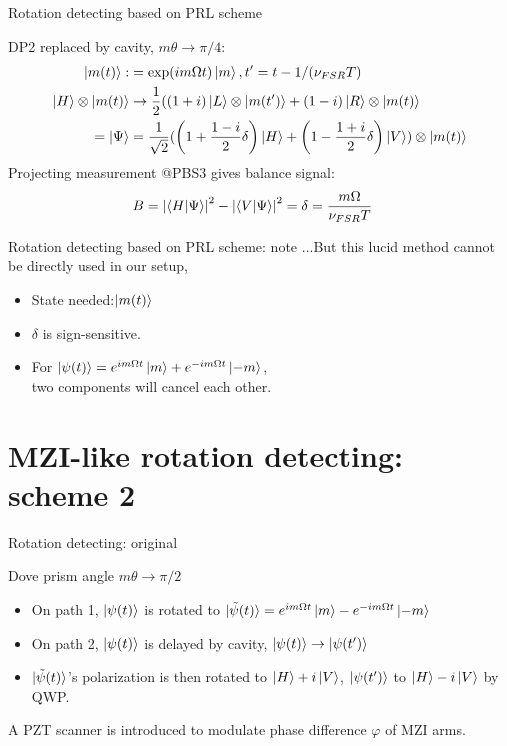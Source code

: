 \documentclass[amssymb, amsmath]{beamer}
\begin{document}
\begin{frame}{Rotation detecting based on PRL scheme}

DP2 replaced by cavity, $m\theta\to\pi/4$:
\begin{align}
    \ket{m(t)} :&= \exp(i m\Omega t)\ket{m}, t^\prime = t-1/(\nu_{FSR}T) \\ 
    \ket{H}\otimes\ket{m(t)} &\to \frac{1}{2}((1+i)\ket{L}\otimes\ket{m(t^\prime)} + (1-i)\ket{R}\otimes\ket{m(t)} \nonumber \\ 
    = \ket{\Psi} &= \frac{1}{\sqrt{2}}(\left(1+\frac{1-i}{2}\delta\right)\ket{H}+\left(1-\frac{1+i}{2}\delta\right)\ket{V})\otimes\ket{m(t)}
\end{align}
Projecting measurement @PBS3 gives balance signal:
\begin{align}
    B &= \left|\braket{H|\Psi}\right|^2 - \left|\braket{V|\Psi}\right|^2 = \delta = \frac{m \Omega}{\nu_{FSR}T}
\end{align}
    
\end{frame}

\begin{frame}{Rotation detecting based on PRL scheme: note}
...But this lucid method cannot be directly used in our setup,
\begin{itemize}
    \item State needed:$\ket{m(t)}$
    \item $\delta$ is sign-sensitive.
    \item For $\ket{\psi(t)}=e^{i m\Omega t}\ket{m}+e^{-i m\Omega t}\ket{-m}$, \\
    \hspace{10pt} two components will \textcolor{suoh}{cancel each other.}
\end{itemize}
    
\end{frame}

\section{MZI-like rotation detecting: scheme 2}

\begin{frame}{Rotation detecting: original}

Dove prism angle $m\theta\to\pi/2$
\begin{itemize}
    \item On path 1, $\ket{\psi(t)}$ is rotated to $\ket{\tilde{\psi}(t)}=e^{i m\Omega t}\ket{m}-e^{-i m\Omega t}\ket{-m}$
    \item On path 2, $\ket{\psi(t)}$ is delayed by cavity, $\ket{\psi(t)}\to\ket{\psi(t^\prime)}$ 
    \item $\ket{\tilde{\psi}(t)}$'s polarization is then rotated to $\ket{H}+i\ket{V}$, $\ket{\psi(t^\prime)}$ to $\ket{H}-i\ket{V}$ by QWP.
\end{itemize}


A PZT scanner is introduced to modulate phase difference $\varphi$ of MZI arms.    

\end{frame}
\end{document}
